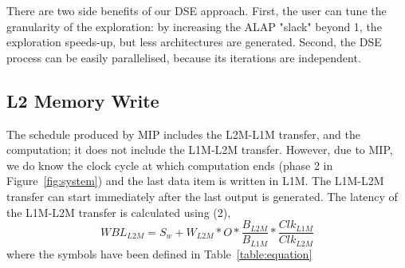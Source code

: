 There are two side benefits of our DSE approach. First, the user can tune the granularity of the exploration: by increasing the ALAP "slack" beyond 1, the exploration speeds-up, but less architectures are generated. Second, the DSE process can be easily parallelised, because its iterations are independent.

\vspace{-1mm}
\subsection{L2 Memory Write}
\vspace{-1mm}
The schedule produced by MIP includes the L2M-L1M transfer, and the computation; it does not include the L1M-L2M transfer. However, due to MIP, we do know the clock cycle at which computation ends (phase 2 in Figure~\ref{fig:system}) and the last data item is written in L1M. The L1M-L2M transfer can start immediately after the last output is generated.
The latency of the L1M-L2M transfer is calculated using (2),
\begin{equation}
    WBL_{L2M} = S_w + W_{L2M} * O * \frac{B_{L2M}}{B_{L1M}} * \frac{Clk_{L1M}}{Clk_{L2M}}
\end{equation}
where the symbols have been defined in Table~\ref{table:equation}

\vspace{-1mm}
